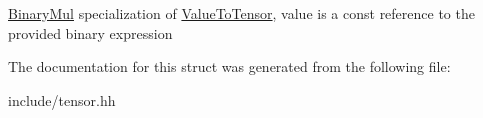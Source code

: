 \hyperlink{classtensor_1_1BinaryMul}{Binary\+Mul} specialization of \hyperlink{structtensor_1_1ValueToTensor}{Value\+To\+Tensor}, {\ttfamily value} is a const reference to the provided binary expression 

The documentation for this struct was generated from the following file\+:\begin{DoxyCompactItemize}
\item 
include/tensor.\+hh\end{DoxyCompactItemize}

